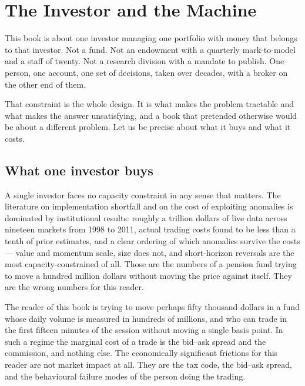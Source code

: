 
\chapter{The Investor and the Machine}
\label{ch:investor}

This book is about one investor managing one portfolio with money that
belongs to that investor. Not a fund. Not an endowment with a quarterly
mark-to-model and a staff of twenty. Not a research division with a mandate
to publish. One person, one account, one set of decisions, taken over
decades, with a broker on the other end of them.

That constraint is the whole design. It is what makes the problem tractable
and what makes the answer unsatisfying, and a book that pretended otherwise
would be about a different problem. Let us be precise about what it buys and
what it costs.

\section{What one investor buys}

A single investor faces no capacity constraint in any sense that matters.
The literature on implementation shortfall and on the cost of exploiting
anomalies is dominated by institutional results: roughly a trillion dollars
of live data across nineteen markets from 1998 to 2011, actual trading costs
found to be less than a tenth of prior estimates, and a clear ordering of
which anomalies survive the costs --- value and momentum scale, size does
not, and short-horizon reversals are the most capacity-constrained of all.
Those are the numbers of a pension fund trying to move a hundred million
dollars without moving the price against itself. They are the wrong numbers
for this reader.

The reader of this book is trying to move perhaps fifty thousand dollars in a
fund whose daily volume is measured in hundreds of millions, and who can
trade in the first fifteen minutes of the session without moving a single
basis point. In such a regime the marginal cost of a trade is the
bid--ask spread and the commission, and nothing else. The economically
significant frictions for this reader are not market impact at all. They are
the tax code, the bid--ask spread, and the behavioural failure modes of the
person doing the trading.

